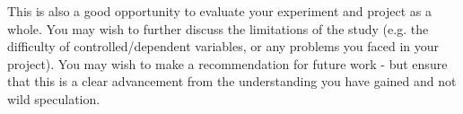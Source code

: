 \documentclass[conference]{IEEEtran}
\begin{document}
This is also a good opportunity to evaluate your experiment and project as a whole.  You may wish to further discuss the limitations of the study (e.g. the difficulty of controlled/dependent variables, or any problems you faced in your project).  You may wish to make a recommendation for future work - but ensure that this is a clear advancement from the understanding you have gained and not wild speculation.


 

\end{document}
